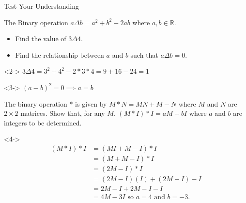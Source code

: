 \documentclass[8pt]{beamer}
\begin{document}
\begin{frame}{Test Your Understanding}
	\begin{problem}
		The Binary operation $a\Delta b = a^2 + b^2 - 2ab$ where  $a,b\in \mathbb{R}$.
		 \begin{itemize}			 
			 \item Find the value of $3\Delta 4$.
			 \item Find the relationship between  $a $ and  $b$ such that $a\Delta b =0$.
		\end{itemize}
	\end{problem}
	\begin{solution}<2->
		$3\Delta 4= 3^2 + 4^2 -2*3*4= 9 + 16 - 24 = 1$
	\end{solution}
\begin{solution}<3->
	$(a-b)^2=0\implies a=b $
\end{solution}
\begin{problem}
	The binary operation $*$ is given by $M*N=MN+M-N$ where  $M$ and  $N$ are  $2\times 2 $ matrices. Show that, for any $M$,  $(M*I)*I=aM+bI$ where $a$ and  $b$ are integers to be determined.
\end{problem}
\begin{solution}<4->
	\begin{align*}
		(M*I)*I &= (MI+M-I)*I \\
			&= (M+M-I)*I \\
			&= (2M-I)*I\\
			&= (2M-I)(I)+(2M-I)-I \\
			&= 2M-I+2M-I-I \\
			&= 4M-3I \text{ so $a=4$ and $b=-3$}
	.\end{align*}

\end{solution}
\end{frame}
\end{document}
